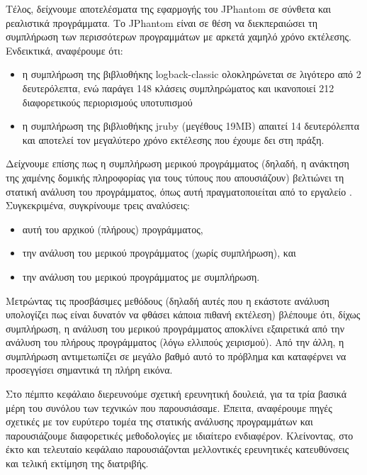 Τέλος, δείχνουμε αποτελέσματα της εφαρμογής του {\en JPhantom} σε
σύνθετα και ρεαλιστικά προγράμματα. Το {\en JPhantom} είναι σε θέση να
διεκπεραιώσει τη συμπλήρωση των περισσότερων προγραμμάτων με αρκετά
χαμηλό χρόνο εκτέλεσης. Ενδεικτικά, αναφέρουμε ότι:
\begin{itemize}
\item η συμπλήρωση της βιβλιοθήκης {\en logback-classic} ολοκληρώνεται
  σε λιγότερο από 2 δευτερόλεπτα, ενώ παράγει 148 κλάσεις
  συμπληρώματος και ικανοποιεί 212 διαφορετικούς περιορισμούς
  υποτυπισμού
\item η συμπλήρωση της βιβλιοθήκης {\en jruby} (μεγέθους {\en 19MB})
  απαιτεί 14 δευτερόλεπτα και αποτελεί τον μεγαλύτερο χρόνο εκτέλεσης
  που έχουμε δει στη πράξη.
\end{itemize}
%
Δείχνουμε επίσης πως η συμπλήρωση μερικού προγράμματος (δηλαδή, η
ανάκτηση της χαμένης δομικής πληροφορίας για τους τύπους που
απουσιάζουν) βελτιώνει τη στατική ανάλυση του προγράμματος, όπως αυτή
πραγματοποιείται από το εργαλείο {\en \doop{}}. Συγκεκριμένα,
συγκρίνουμε τρεις αναλύσεις:
\begin{itemize}
\item αυτή του αρχικού (πλήρους) προγράμματος,
\item την ανάλυση του μερικού προγράμματος (χωρίς συμπλήρωση), και
\item την ανάλυση του μερικού προγράμματος με συμπλήρωση.
\end{itemize}
Μετρώντας τις προσβάσιμες μεθόδους (δηλαδή αυτές που η εκάστοτε
ανάλυση υπολογίζει πως είναι δυνατόν να φθάσει κάποια πιθανή εκτέλεση)
βλέπουμε ότι, δίχως συμπλήρωση, η ανάλυση του μερικού προγράμματος
αποκλίνει εξαιρετικά από την ανάλυση του πλήρους προγράμματος (λόγω
ελλιπούς χειρισμού). Από την άλλη, η συμπλήρωση αντιμετωπίζει σε
μεγάλο βαθμό αυτό το πρόβλημα και καταφέρνει να προσεγγίσει σημαντικά
τη πλήρη εικόνα.



\vspace{2em}
Στο πέμπτο κεφάλαιο διερευνούμε σχετική ερευνητική δουλειά, για τα
τρία βασικά μέρη του συνόλου των τεχνικών που παρουσιάσαμε. Έπειτα,
αναφέρουμε πηγές σχετικές με τον ευρύτερο τομέα της στατικής ανάλυσης
προγραμμάτων και παρουσιάζουμε διαφορετικές μεθοδολογίες με ιδιαίτερο
ενδιαφέρον.
%
Κλείνοντας, στο έκτο και τελευταίο κεφάλαιο παρουσιάζονται μελλοντικές
ερευνητικές κατευθύνσεις και τελική εκτίμηση της διατριβής.


